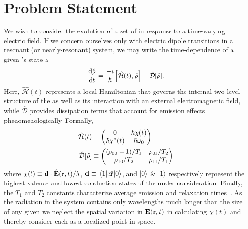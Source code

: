 \section{\label{section:problem statement}Problem Statement}
We wish to consider the evolution of a set of \qds{} in response to a time-varying electric field.
If we concern ourselves only with electric dipole transitions in a resonant (or nearly-resonant) system, we may write the time-dependence of a given \qd's state a
\begin{equation}
  \dv{\hat{\rho}}{t} = \frac{-i}{\hbar}\commutator{\hat{\mathcal{H}}(t)}{\hat{\rho}} - \hat{\mathcal{D}}\qty[\hat{\rho}].
  \label{eq:liouville}
\end{equation}
Here, $\hat{\mathcal{H}}(t)$ represents a local Hamiltonian that governs the internal two-level structure of the \qd{} as well as its interaction with an external electromagnetic field, while $\hat{\mathcal{D}}$ provides dissipation terms that account for emission effects phenomenologically.
Formally,
\begin{subequations}
  \begin{align}
    \hat{\mathcal{H}}(t) &\equiv \mqty(0 & \hbar \chi(t) \\ \hbar \chi^*(t) & \hbar \omega_0) \label{eq:hamiltonian}\\
    \hat{\mathcal{D}}\qty[\hat{\rho}] &\equiv \mqty( \qty(\rho_{00} - 1)/{T_1} & \rho_{01}/{T_2} \\ \rho_{10}/{T_2} & \rho_{11}/T_1 ) \label{eq:dissipator}
  \end{align}
\end{subequations}
where $\chi(t) \equiv \vb{d} \cdot \hat{\vb{E}}(\vb{r}, t)/\hbar$, $\vb{d} \equiv \matrixel{1}{e \hat{\vb{r}}}{0}$, and $\ket{0}$ \& $\ket{1}$ respectively represent the highest valence and lowest conduction states of the \qd{} under consideration.
Finally, the $T_1$ and $T_2$ constants characterize average emission and relaxation times~\cite{}.
As the radiation in the system contains only wavelengths much longer than the size of any given \qd{} we neglect the spatial variation in $\vb{E}(\vb{r}, t)$ in calculating $\chi(t)$ and thereby consider each \qd{} as a localized point in space.

